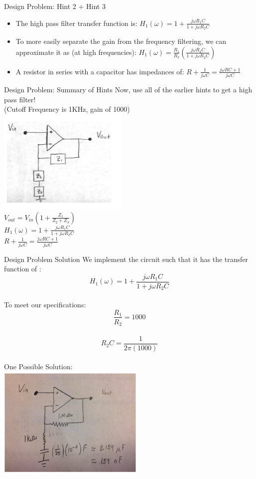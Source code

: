 \documentclass{beamer}
\begin{document}
    \begin{frame}{Design Problem: Hint 2 + Hint 3}
        \begin{itemize}
            \item The high pass filter transfer function is: $H_1(\omega) = 1 + \frac{j\omega R_1C}{1 + j\omega R_2C}$
            \item To more easily separate the gain from the frequency filtering, we can approximate it as (at high frequencies): $H_1(\omega) = \frac{R_1}{R_2}(\frac{j\omega R_2C}{1 + j\omega R_2 C})$
            \item A resistor in series with a capacitor has impedances of: $R + \frac{1}{j\omega C} = \frac{j \omega RC +1}{j\omega C}$
        \end{itemize}
    \end{frame}
    \begin{frame}{Design Problem: Summary of Hints}
    Now, use all of the earlier hints to get a high pass filter!\\
    (Cutoff Frequency is 1KHz, gain of 1000)\\
    \includegraphics[scale=0.75]{design-problem-summary.png}\\
    $V_{out} = V_{in}(1 + \frac{Z_1}{Z_2+Z_3})$\\
    $H_1(\omega) = 1 + \frac{j\omega R_1 C}{1 + j \omega R_2 C}$ \\
    $R + \frac{1}{j\omega C} = \frac{j \omega RC + 1}{j \omega C}$
    \end{frame}
    \begin{frame}{Design Problem Solution}
        We implement the circuit such that it has the transfer function of :\\
        $$H_1(\omega) = 1 + \frac{j\omega R_1C}{1 + j\omega R_2C}$$\\
        To meet our specifications: \\
        $$\frac{R_1}{R_2} = 1000$$ \\
        $$R_2C = \frac{1}{2\pi(1000)}$$\\
        One Possible Solution: \\
        \includegraphics[scale=0.65]{design-problem-solution.png}
    \end{frame}
\end{document}
